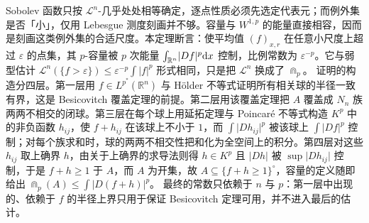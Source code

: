 \documentclass[../../main.tex]{subfiles}%
\begin{document}
\begin{remark}\label{remark:ch04-thm-4-18-动机}
Sobolev 函数只按 $\mathcal{L}^n$-几乎处处相等确定，逐点性质必须先选定代表元；而例外集是否「小」，仅用 Lebesgue 测度刻画并不够。容量与 $W^{1,p}$ 的能量直接相容，因而是刻画这类例外集的合适尺度。本定理断言：使平均值 $(f)_{x,r}$ 在任意小尺度上超过 $\varepsilon$ 的点集，其 $p$-容量被 $p$ 次能量 $\int_{\mathbb{R}^n}\lvert Df\rvert^p\mathrm{d} x$ 控制，比例常数为 $\varepsilon^{-p}$。它与弱型估计 $\mathcal{L}^n(\{f>\varepsilon\})\leqslant\varepsilon^{-p}\int\lvert f\rvert^p$ 形式相同，只是把 $\mathcal{L}^n$ 换成了 $\Cap_p$。
证明的构造分四层。第一层用 $f\in L^{p^*}(\mathbb{R}^n)$ 与 Hölder 不等式证明所有相关球的半径一致有界，这是 Besicovitch 覆盖定理的前提。第二层用该覆盖定理把 $A$ 覆盖成 $N_n$ 族两两不相交的闭球。第三层在每个球上用延拓定理与 Poincaré 不等式构造 $K^p$ 中的非负函数 $h_{ij}$，使 $f+h_{ij}$ 在该球上不小于 $1$，而 $\int\lvert Dh_{ij}\rvert^p$ 被该球上 $\int\lvert Df\rvert^p$ 控制；对每个族求和时，球的两两不相交性把和化为全空间上的积分。第四层对这些 $h_{ij}$ 取上确界 $h$，由关于上确界的求导法则得 $h\in K^p$ 且 $\lvert Dh\rvert$ 被 $\sup\lvert Dh_{ij}\rvert$ 控制，于是 $f+h\geqslant1$ 于 $A$，而 $A$ 为开集，故 $A\subseteq\{f+h\geqslant1\}^{\circ}$，容量的定义随即给出 $\Cap_p(A)\leqslant\int\lvert D(f+h)\rvert^p$。
最终的常数只依赖于 $n$ 与 $p$：第一层中出现的、依赖于 $f$ 的半径上界只用于保证 Besicovitch 定理可用，并不进入最后的估计。
\end{remark}
\end{document}
